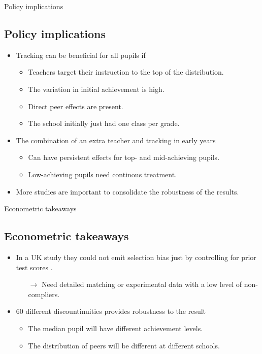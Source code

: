 \documentclass[9pt]{beamer}
\numberwithin{equation}{section}
\begin{document}
\begin{frame}{Policy implications}
  \subsection{Policy implications}
  \begin{itemize}
    \item Tracking can be beneficial for all pupils if
    \begin{itemize}
      \item Teachers target their instruction to the top of the distribution.
      \item The variation in initial achievement is high.
      \item Direct peer effects are present.
      \item The school initially just had one class per grade.
    \end{itemize}
    \item The combination of an extra teacher and tracking in early years
    \begin{itemize}
      \item Can have persistent effects for top- and mid-achieving pupils.
      \item Low-achieving pupils need continous treatment.
    \end{itemize}
    \item More studies are important to consolidate the robustness of the results.
  \end{itemize}
\end{frame}


\begin{frame}{Econometric takeaways}
  \subsection{Econometric takeaways}
  \begin{itemize}
    \item In a UK study they could not emit selection bias just by controlling for prior test scores \citep{manning2006comprehensive}.
    \begin{itemize}
      \item[$\rightarrow$] Need detailed matching or experimental data with a low level of non-compliers.
    \end{itemize}
    \item 60 different discountinuities provides robustness to the result
    \begin{itemize}
      \item The median pupil will have different achievement levels.
      \item The distribution of peers will be different at different schools.
    \end{itemize}
  \end{itemize}
\end{frame}
\end{document}
